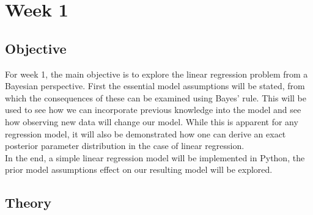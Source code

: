 \section{Week 1}
\subsection{Objective}
For week 1, the main objective is to explore the linear regression problem from a Bayesian perspective. 
First the essential model assumptions will be stated, from which the consequences of these can be examined using Bayes' rule.
This will be used to see how we can incorporate previous knowledge into the model and see how observing new data will change our model.
While this is apparent for any regression model, it will also be demonstrated how one can derive an exact posterior parameter distribution in the case of linear regression.\\
In the end, a simple linear regression model will be implemented in Python, the prior model assumptions effect on our resulting model will be explored.
\subsection{Theory}
